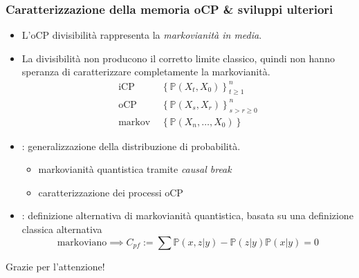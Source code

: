 \documentclass{beamer}
\begin{document}
\begin{frame}
\frametitle{Caratterizzazione della memoria oCP \& sviluppi ulteriori}
\begin{itemize}
\item L'oCP divisibilità rappresenta la \emph{markovianità in media}. 

\item La divisibilità non producono il corretto limite classico, quindi non hanno speranza di caratterizzare completamente la markovianità.
\begin{align*}
\text{iCP }&\left\{\mathbb{P}\left(X_{t},X_0\right)\right\}^n_{t\ge 1} \\
\text{oCP }&\left\{\mathbb{P}\left(X_{s},X_r\right)\right\}^n_{s>r \ge 0} \\
\text{markov }&\left\{\mathbb{P}\left(X_{n},\dots,X_0\right)\right\}
\end{align*}

\item {} \cite{markovcondition}: generalizzazione della distribuzione di  probabilità.
\begin{itemize}
	\item markovianità quantistica tramite \emph{causal break}
	\item caratterizzazione dei processi oCP
\end{itemize}

\item {} \cite{budini2018quantum}: definizione alternativa di markovianità quantistica, basata su una definizione classica alternativa
\[\text{markoviano}\implies C_{pf} := \sum \mathbb{P}(x,z|y)-\mathbb{P}(z|y)\mathbb{P}(x|y)=0\]
\end{itemize}
\end{frame}

\begin{frame}

\centerline{\huge Grazie per l'attenzione!} 

\vfill
\textbf{}
\printbibliography
\centerline{\resizebox{2.3cm}{!}{}}

\end{frame}
\end{document}
